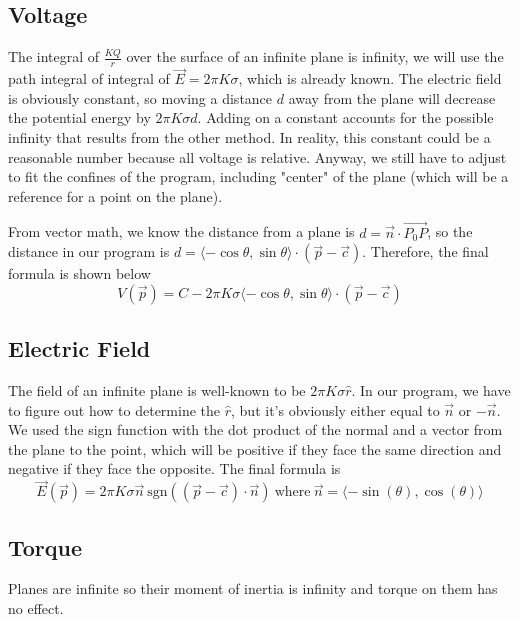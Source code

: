 \documentclass{article}
\begin{document}
\subsection{Voltage}
The integral of $\frac{KQ}{r}$ over the surface of an infinite plane is infinity, we will use the path integral of integral of $\vec{E} = 2\pi K\sigma$, which is already known. The electric field is obviously constant, so moving a distance $d$ away from the plane will decrease the potential energy by $2\pi K \sigma d$. Adding on a constant accounts for the possible infinity that results from the other method. In reality, this constant could be a reasonable number because all voltage is relative. Anyway, we still have to adjust to fit the confines of the program, including "center" of the plane (which will be a reference for a point on the plane).

From vector math, we know the distance from a plane is $d= \vec{n}\cdot\vec{P_0P}$, so the distance in our program is $d=\langle-\cos{\theta},\sin{\theta}\rangle\cdot(\vec{p}-\vec{c})$. Therefore, the final formula is shown below
\begin{equation}
    V(\vec{p}) = C - 2\pi K\sigma \langle-\cos{\theta},\sin{\theta}\rangle\cdot(\vec{p}-\vec{c})
\end{equation}

\subsection{Electric Field}
The field of an infinite plane is well-known to be $2\pi K\sigma \hat{r}$. In our program, we have to figure out how to determine the $\hat{r}$, but it's obviously either equal to $\vec{n}$ or $-\vec{n}$. We used the sign function with the dot product of the normal and a vector from the plane to the point, which will be positive if they face the same direction and negative if they face the opposite. The final formula is
\begin{equation}
    \vec{E}(\vec{p}) = 2\pi K\sigma\vec{n}\ \text{sgn}((\vec{p}-\vec{c})\cdot\vec{n})\ \text{where}\ \vec{n}=\langle-\sin(\theta),\cos(\theta)\rangle
\end{equation}

\subsection{Torque}
Planes are infinite so their moment of inertia is infinity and torque on them has no effect.
\end{document}
